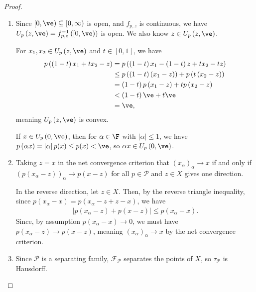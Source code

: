\documentclass[10pt]{mypackage}
\begin{document}
\begin{proof}\hfill
  \begin{enumerate}[(1)]
    \item Since $[0,\ve)\subseteq [0,\infty)$ is open, and $f_{p,z}$ is continuous, we have $U_{p}\left(z,\ve\right) = f_{p,z}^{-1}\left([0,\ve)\right)$ is open. We also know $z\in U_{p}\left(z,\ve\right)$.\newline

      For $x_1,x_2\in U_{p}\left(z,\ve\right)$ and $t\in [0,1]$, we have
      \begin{align*}
        p\left(\left(1-t\right)x_1 + tx_2 - z\right) &= p\left(\left(1-t\right)x_{1} - \left(1-t\right)z + tx_2 - tz\right)\\
                                                     &\leq p\left(\left(1-t\right)\left(x_1 - z\right)\right) + p\left(t\left(x_2 - z\right)\right)\\
                                                     &= \left(1-t\right)p\left(x_1 - z\right) + tp\left(x_2 - z\right)\\
                                                     &< \left(1-t\right)\ve + t\ve\\
                                                     &= \ve,
      \end{align*}
      meaning $U_{p}\left(z,\ve\right)$ is convex.\newline

      If $x\in U_{p}\left(0,\ve\right)$, then for $\alpha \in \F$ with $\left\vert \alpha \right\vert \leq 1$, we have $p\left(\alpha x\right) = \left\vert \alpha \right\vert p(x) \leq p(x) < \ve$, so $\alpha x \in U_{p}\left(0,\ve\right)$.
    \item Taking $z=x$ in the net convergence criterion that $\left(x_{\alpha}\right)_{\alpha}\rightarrow x$ if and only if $\left(p\left(x_{\alpha} - z\right)\right)_{\alpha}\rightarrow p\left(x-z\right)$ for all $p\in \mathcal{P}$ and $z\in X$ gives one direction.\newline

      In the reverse direction, let $z\in X$. Then, by the reverse triangle inequality, since $p\left(x_{\alpha} - x\right) = p\left(x_{\alpha} - z + z -x\right)$, we have
      \begin{align*}
        \left\vert p\left(x_{\alpha} - z\right) + p\left(x - z\right) \right\vert \leq p\left(x_{\alpha} - x\right).
      \end{align*}
      Since, by assumption $p\left(x_{\alpha} - x\right)\rightarrow 0$, we must have $p\left(x_{\alpha} - z\right)\rightarrow p\left(x - z\right)$, meaning $\left(x_{\alpha}\right)_{\alpha}\rightarrow x$ by the net convergence criterion.
    \item Since $\mathcal{P}$ is a separating family, $\mathcal{F}_{\mathcal{P}}$ separates the points of $X$, so $\tau_{\mathcal{P}}$ is Hausdorff.\newline


\end{enumerate}
\end{proof}
\end{document}
